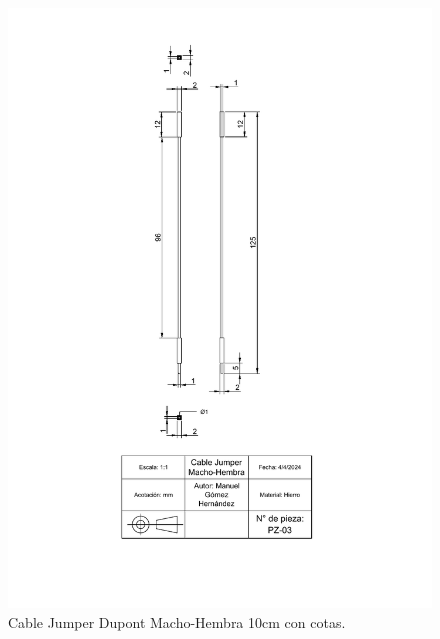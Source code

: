     
    \begin{figure}[H]
        \centering
        \includegraphics[scale=0.4]{15/img/cableJumperMHTrazo.pdf}
        \caption{Cable Jumper Dupont Macho-Hembra 10cm con cotas.}
        \label{fig:cableJumperMHTrazo}
    \end{figure}
    
